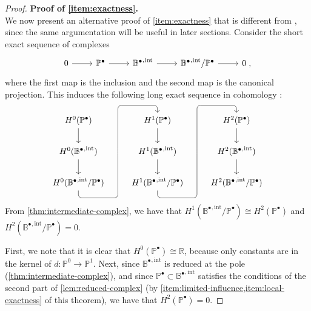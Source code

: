 \documentclass[10pt]{article}
\newcommand{\RR}{{\mathbb{R}}}
\newcommand{\isomorphic}{\cong}
\newcommand{\vSpace}[1]{\mathbb{#1}}
\newcommand{\complex}[1]{\mathit{\vSpace{#1}^\bullet}}
\newcommand{\bsp}{B}
\newcommand{\polar}{P}
\newcommand{\polarS}{\vSpace{\polar}}
\newcommand{\polarF}[1]{\polarS^{#1}}
\newcommand{\tint}{\mathrm{int}}
\theoremstyle{plain}
\theoremstyle{definition}
\theoremstyle{remark}
\begin{document}
\begin{proof}
    \noindent
    \textbf{Proof of \cref{item:exactness}.}\\
    We now present an alternative proof of \cref{item:exactness} that is different from \cite{Toshniwal:2021}, since the same argumentation will be useful in later sections.
    Consider the short exact sequence of complexes
    \begin{equation*}
        \begin{tikzcd}
            0 \arrow{r} & \complex{\polar} \arrow{r}{} & \complex{\bsp}^{,\tint} \arrow{r}{} & \complex{\bsp}^{,\tint} / \complex{\polar}  \arrow{r} & 0\;,
        \end{tikzcd}
    \end{equation*}
    where the first map is the inclusion and the second map is the canonical projection.
    This induces the following long exact sequence in cohomology \cite{Hatcher:2002}:
    \begin{equation*}
        \begin{tikzcd}
        H^0(\complex{\polar}) \arrow[d] & H^1(\complex{\polar}) \arrow[d] & H^2(\complex{\polar}) \arrow[d] \\
        H^0(\complex{\bsp}^{,\tint}) \arrow[d] \ar[draw=none]{r}[name=X, anchor=center]{}  & H^1(\complex{\bsp}^{,\tint}) \arrow[d] \ar[draw=none]{r}[name=Y, anchor=center]{}  & H^2(\complex{\bsp}^{,\tint}) \arrow[d] \\
        H^0(\complex{\bsp}^{,\tint} / \complex{\polar}) \ar[rounded corners,
        to path={ -- ([yshift=-2ex]\tikztostart.south)
                  -| (X.center) \tikztonodes
                  |- ([yshift=2ex]\tikztotarget.north)
                  -- (\tikztotarget)}]{ruu}[at end]{} & H^1(\complex{\bsp}^{,\tint} / \complex{\polar}) \ar[rounded corners,
                  to path={ -- ([yshift=-2ex]\tikztostart.south)
                            -| (Y.center) \tikztonodes
                            |- ([yshift=2ex]\tikztotarget.north)
                            -- (\tikztotarget)}]{ruu}[at end]{} & H^2(\complex{\bsp}^{,\tint} / \complex{\polar})
        \end{tikzcd}
    \end{equation*}
    From \cref{thm:intermediate-complex}, we have that $H^1(\complex{\bsp}^{,\tint} / \complex{\polar}) \isomorphic H^2(\complex{\polar})$ and $H^2(\complex{\bsp}^{,\tint} / \complex{\polar}) = 0$.

    First, we note that it is clear that $H^0(\complex{\polar}) \isomorphic \RR$, because only constants are in the kernel of $d : \polarF{0} \rightarrow \polarF{1}$.
    Next, since $\complex{\bsp}^{,\tint}$ is reduced at the pole (\cref{thm:intermediate-complex}), and since $\complex{\polar} \subset \complex{\bsp}^{,\tint}$ satisfies the conditions of the second part of \cref{lem:reduced-complex} (by \cref{item:limited-influence,item:local-exactness} of this theorem), we have that $H^2(\complex{\polar}) = 0$.


\end{proof}
\end{document}
